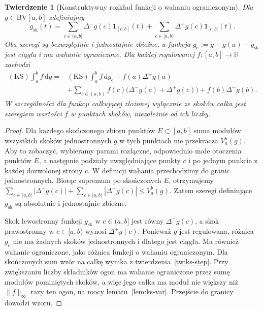 \documentclass[11pt,a4paper]{article}
\numberwithin{equation}{section}
\theoremstyle{plain}
\newtheorem{twierdzenie}{Twierdzenie}[section]
\theoremstyle{definition}
\theoremstyle{remark}
\newcommand{\R}{\mathbb R}
\newcommand{\ind}[1]{\mathbf 1_{#1}}
\newcommand{\BV}{\mathrm{BV}}
\newcommand{\KS}{\mathrm{KS}}
\begin{document}
\begin{twierdzenie}[Konstruktywny rozkład funkcji o wahaniu ograniczonym]
\label{tw:ks-bv-split}
Dla $g\in\BV[a,b]$ zdefiniujmy
\[
 g_{\mathrm{sk}}(t)=
 \sum_{c\in(a,b]}\Delta^-g(c)\ind{[c,b]}(t)
 +\sum_{c\in[a,b)}\Delta^+g(c)\ind{(c,b]}(t).
\]
Oba szeregi są bezwzględnie i jednostajnie zbieżne, a funkcja $g_{\mathrm c}:=g-g(a)-g_{\mathrm{sk}}$ jest ciągła i ma wahanie ograniczone. Dla każdej regulowanej $f:[a,b]\to\R$ zachodzi
\[
 \begin{aligned}
 (\KS)\int_a^b f\,\mathrm dg
 ={}&(\KS)\int_a^b f\,\mathrm dg_{\mathrm c}
 +f(a)\Delta^+g(a)\\
 &+\sum_{c\in(a,b)}f(c)\bigl(\Delta^-g(c)+\Delta^+g(c)\bigr)
 +f(b)\Delta^-g(b).
 \end{aligned}
\]
W szczególności dla funkcji całkującej złożonej wyłącznie ze skoków całka jest szeregiem wartości $f$ w punktach skoków, niezależnie od ich liczby.
\end{twierdzenie}
\begin{proof}
Dla każdego skończonego zbioru punktów $E\subset[a,b]$ suma modułów wszystkich skoków jednostronnych $g$ w tych punktach nie przekracza $V_a^b(g)$. Aby to zobaczyć, wybieramy parami rozłączne, odpowiednio małe otoczenia punktów $E$, a następnie podziały uwzględniające punkty $c$ i po jednym punkcie z każdej dozwolonej strony $c$. W definicji wahania przechodzimy do granic jednostronnych. Biorąc supremum po skończonych $E$, otrzymujemy
$\sum_{c\in(a,b]}|\Delta^-g(c)|+\sum_{c\in[a,b)}|\Delta^+g(c)|\le V_a^b(g)$. Zatem szeregi definiujące $g_{\mathrm{sk}}$ są absolutnie i jednostajnie zbieżne.

Skok lewostronny funkcji $g_{\mathrm{sk}}$ w $c\in(a,b]$ jest równy $\Delta^-g(c)$, a skok prawostronny w $c\in[a,b)$ wynosi $\Delta^+g(c)$. Ponieważ $g$ jest regulowana, różnica $g_{\mathrm c}$ nie ma żadnych skoków jednostronnych i dlatego jest ciągła. Ma również wahanie ograniczone, jako różnica funkcji o wahaniu ograniczonym. Dla skończonych sum wzór na całkę wynika z twierdzenia~\ref{tw:ks-step}. Przy zwiększaniu liczby składników ogon ma wahanie ograniczone przez sumę modułów pominiętych skoków, a więc jego całka ma moduł nie większy niż $\|f\|_\infty$ razy ten ogon, na mocy lematu~\ref{lem:ks-var}. Przejście do granicy dowodzi wzoru.
\end{proof}
\end{document}
